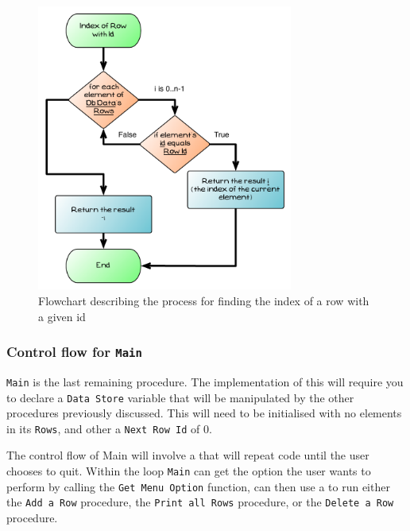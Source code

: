 \begin{figure}[h]
   \centering
   \includegraphics[width=0.75\textwidth]{./topics/dynamic-memory/diagrams/IndexOfRowFlow} 
   \caption{Flowchart describing the process for finding the index of a row with a given id}
   \label{fig:index-of-row-flow}
\end{figure}



\subsubsection{Control flow for \texttt{Main}} %
\label{ssub:control_flow_for_main}

\texttt{Main} is the last remaining procedure. The implementation of this will require you to declare a \texttt{Data Store} variable that will be manipulated by the other procedures previously discussed. This will need to be initialised with no elements in its \texttt{Rows}, and other a \texttt{Next Row Id} of 0.

The control flow of Main will involve a  that will repeat code until the user chooses to quit. Within the loop \texttt{Main} can get the option the user wants to perform by calling the \texttt{Get Menu Option} function, can then use a  to run either the \texttt{Add a Row} procedure, the \texttt{Print all Rows} procedure, or the \texttt{Delete a Row} procedure.

